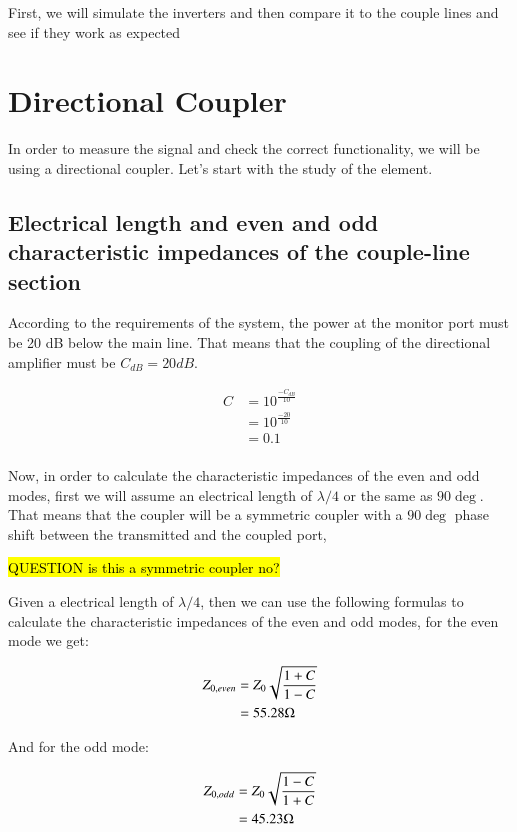 \documentclass[12pt]{report} %
\newcommand{\question}[1]{\sethlcolor{red}\hl{QUESTION #1}}
\begin{document}
First, we will simulate the inverters and then compare it to the couple lines and see if they work as expected

\section{Directional Coupler}

In order to measure the signal and check the correct functionality, we will be using a directional coupler. Let's start with the study of the element.

\subsection{Electrical length and even and odd characteristic impedances of the couple-line section}

According to the requirements of the system, the power at the monitor port must be 20 dB below the main line. That means that the coupling of the directional amplifier must be $C_{dB} = 20 dB$.

\begin{align*}
C &= 10^{\frac{- C_{dB}}{10}} \\
&= 10^{\frac{- 20}{10}} \\
&= 0.1 \\
\end{align*}

Now, in order to calculate the characteristic impedances of the even and odd modes, first we will assume an electrical length of $\lambda / 4$ or the same as $90 \deg$. That means that the coupler will be a symmetric coupler with a $90 \deg$ phase shift between the transmitted and the coupled port,

\question{is this a symmetric coupler no?}

Given a electrical length of $\lambda / 4$, then we can use the following formulas to calculate the characteristic impedances of the even and odd modes, for the even mode we get:

\begin{align*}
Z_{0, even} &= Z_{0} \* \sqrt{\frac{1 + C}{1 - C}} \\
&= 55.28 \Omega \\
\end{align*}

And for the odd mode:

\begin{align*}
Z_{0, odd} &= Z_{0} \* \sqrt{\frac{1 - C}{1 + C}} \\
&= 45.23 \Omega \\
\end{align*}
\end{document}
